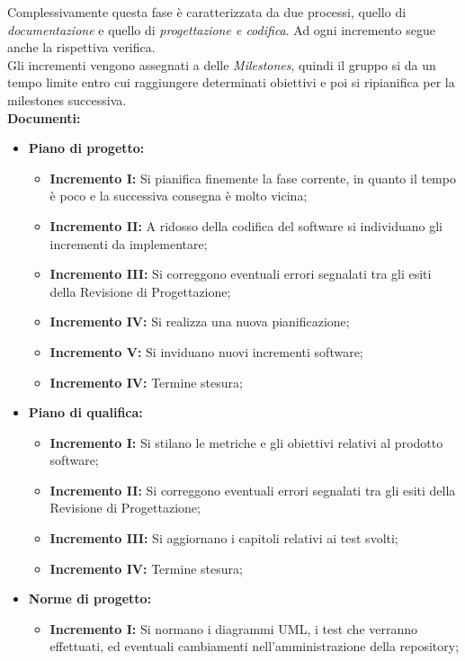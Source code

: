\documentclass[../piano_di_progetto.tex]{subfiles}
\begin{document}
Complessivamente questa fase è caratterizzata da due processi, quello di \emph{documentazione} e quello di \emph{progettazione e codifica}. Ad ogni incremento segue anche la rispettiva verifica. \\
Gli incrementi vengono assegnati a delle \emph{Milestones}, quindi il gruppo si da un tempo limite entro cui raggiungere determinati obiettivi e poi si ripianifica per la 
milestones successiva.\\
\textbf{Documenti:}
\begin{itemize}
    \item \textbf{Piano di progetto:}
        \begin{itemize}
            \item \textbf{Incremento I:} Si pianifica finemente la fase corrente, in quanto il tempo è poco e la successiva consegna è molto vicina;
            \item \textbf{Incremento II:} A ridosso della codifica del software si individuano gli incrementi da implementare;
            \item \textbf{Incremento III:} Si correggono eventuali errori segnalati tra gli esiti della Revisione di Progettazione;
            \item \textbf{Incremento IV:} Si realizza una nuova pianificazione;
            \item \textbf{Incremento V:} Si inviduano nuovi incrementi software;
            \item \textbf{Incremento IV:} Termine stesura;
        \end{itemize}
        \item \textbf{Piano di qualifica:}
        \begin{itemize}
            \item \textbf{Incremento I:} Si stilano le metriche e gli obiettivi relativi al prodotto software;
            \item \textbf{Incremento II:} Si correggono eventuali errori segnalati tra gli esiti della Revisione di Progettazione;
            \item \textbf{Incremento III:} Si aggiornano i capitoli relativi ai test svolti;
            \item \textbf{Incremento IV:} Termine stesura;
        \end{itemize}
        \item \textbf{Norme di progetto:}
        \begin{itemize}
            \item \textbf{Incremento I:} Si normano i diagrammi UML, i test che verranno effettuati, ed eventuali cambiamenti nell'amministrazione della repository;

\end{itemize}
\end{itemize}
\end{document}
